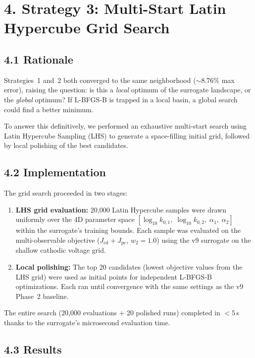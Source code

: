 \documentclass[11pt]{article}
\begin{document}
\section*{4. Strategy 3: Multi-Start Latin Hypercube Grid Search}

\subsection*{4.1 Rationale}

Strategies~1 and~2 both converged to the same neighborhood (${\sim}8.76\%$
max error), raising the question: is this a \emph{local} optimum of the
surrogate landscape, or the \emph{global} optimum?  If L-BFGS-B is trapped
in a local basin, a global search could find a better minimum.

To answer this definitively, we performed an exhaustive multi-start search
using Latin Hypercube Sampling (LHS) to generate a space-filling initial grid,
followed by local polishing of the best candidates.

\subsection*{4.2 Implementation}

The grid search proceeded in two stages:
\begin{enumerate}
  \item \textbf{LHS grid evaluation:} 20{,}000 Latin Hypercube samples were
        drawn uniformly over the 4D parameter space $[\log_{10} k_{0,1},\;
        \log_{10} k_{0,2},\; \alpha_1,\; \alpha_2]$ within the surrogate's
        training bounds.  Each sample was evaluated on the multi-observable
        objective ($J_{\text{cd}} + J_{\text{pc}}$, $w_2 = 1.0$) using the
        v9 surrogate on the shallow cathodic voltage grid.

  \item \textbf{Local polishing:} The top 20 candidates (lowest objective
        values from the LHS grid) were used as initial points for independent
        L-BFGS-B optimizations.  Each ran until convergence with the same
        settings as the v9 Phase~2 baseline.
\end{enumerate}

The entire search (20{,}000 evaluations + 20 polished runs) completed in
$< 5$\,s thanks to the surrogate's microsecond evaluation time.

\subsection*{4.3 Results}
\end{document}
